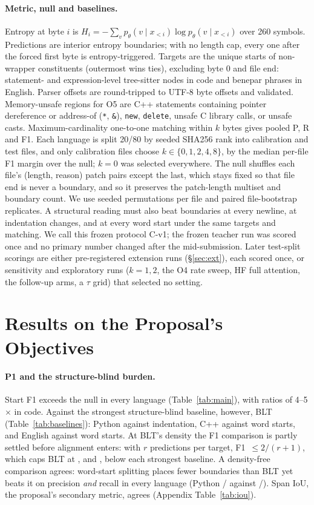 \paragraph{Metric, null and baselines.} Entropy at byte $i$ is $H_i=-\sum_v p_\theta(v\mid x_{<i})\log p_\theta(v\mid x_{<i})$ over 260 symbols. Predictions are interior entropy boundaries; with no length cap, every one after the forced first byte is entropy-triggered. Targets are the unique starts of non-wrapper constituents (outermost wins ties), excluding byte 0 and file end: statement- and expression-level tree-sitter nodes in code and benepar phrases in English. Parser offsets are round-tripped to UTF-8 byte offsets and validated. Memory-unsafe regions for O5 are C++ statements containing pointer dereference or address-of (\texttt{*}, \texttt{\&}), \texttt{new}, \texttt{delete}, unsafe C library calls, or unsafe casts. Maximum-cardinality one-to-one matching within $k$ bytes gives pooled P, R and F1. Each language is split 20/80 by seeded SHA256 rank into calibration and test files, and only calibration files choose $k\in\{0,1,2,4,8\}$, by the median per-file F1 margin over the null; $k=0$ was selected everywhere. The null shuffles each file's (length, reason) patch pairs except the last, which stays fixed so that file end is never a boundary, and so it preserves the patch-length multiset and boundary count. We use \nPerm{} seeded permutations per file and \nBoot{} paired file-bootstrap replicates. A structural reading must also beat boundaries at every newline, at indentation changes, and at every word start under the same targets and matching. We call this frozen protocol C-v1; the frozen teacher run was scored once and no primary number changed after the mid-submission. Later test-split scorings are either pre-registered extension runs (\S\ref{sec:ext}), each scored once, or sensitivity and exploratory runs ($k=1,2$, the O4 rate sweep, HF full attention, the follow-up arms, a $\tau$ grid) that selected no setting.

\section{Results on the Proposal's Objectives}
\TableMain
\paragraph{P1 and the structure-blind burden.} Start F1 exceeds the null in every language (Table~\ref{tab:main}), with ratios of 4--5$\times$ in code. Against the strongest structure-blind baseline, however, BLT \RTwoAll{} (Table~\ref{tab:baselines}): Python \VsBasePy{} \VsBaseCIPy{} against indentation, C++ \VsBaseCpp{} against word starts, and English \VsBaseEn{} against word starts. At BLT's density the F1 comparison is partly settled before alignment enters: with $r$ predictions per target, F1~$\le 2/(r+1)$, which caps BLT at \xFoneCapPy{}, \xFoneCapCpp{} and \xFoneCapEn{}, below each strongest baseline. A density-free comparison agrees: word-start splitting places fewer boundaries than BLT yet beats it on precision \emph{and} recall in every language (Python \xWordPPy{}/\xWordRPy{} against \PrecPy{}/\RecPy{}). Span IoU, the proposal's secondary metric, agrees (Appendix Table~\ref{tab:iou}).

